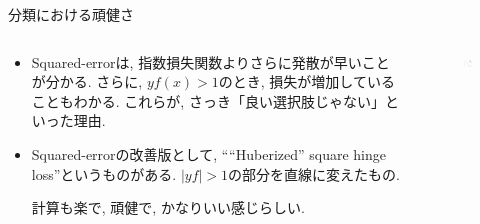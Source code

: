 \documentclass[dvipdfmx,8pt]{beamer}
\begin{document}
  \begin{frame}{分類における頑健さ}
    \begin{columns}[t]
      \begin{column}{0.5\linewidth}
        \begin{itemize}
          \item Squared-errorは, 指数損失関数よりさらに発散が早いことが分かる.
          さらに, $yf(x)>1$のとき, 損失が増加していることもわかる.
          これらが, さっき「良い選択肢じゃない」といった理由.

          \item Squared-errorの改善版として, ````Huberized'' square hinge loss''というものがある. $|yf|>1$の部分を直線に変えたもの.

          計算も楽で, 頑健で, かなりいい感じらしい.
        \end{itemize}
      \end{column}
      \begin{column}{0.5\linewidth}
        \begin{figure}[htb]
          \centering
          \includegraphics[width=5cm,clip]{images/RobustnessClassification.png}
        \end{figure}
      \end{column}
    \end{columns}
  \end{frame}
\end{document}
